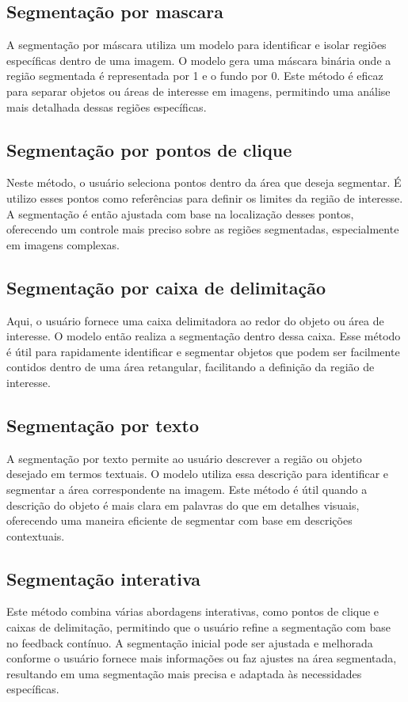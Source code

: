 \subsection{Segmentação por mascara}
A segmentação por máscara utiliza um modelo para identificar e isolar regiões específicas dentro de uma imagem. 
O modelo gera uma máscara binária onde a região segmentada é representada por 1 e o fundo por 0.
 Este método é eficaz para separar objetos ou áreas de interesse em imagens, permitindo uma análise mais detalhada dessas regiões específicas.

\subsection{Segmentação por pontos de clique}
Neste método, o usuário seleciona pontos dentro da área que deseja segmentar.
É utilizo esses pontos como referências para definir os limites da região de interesse.
 A segmentação é então ajustada com base na localização desses pontos, oferecendo um controle mais preciso sobre as regiões segmentadas, especialmente em imagens complexas.

\subsection{Segmentação por caixa de delimitação}
Aqui, o usuário fornece uma caixa delimitadora ao redor do objeto ou área de interesse. 
O modelo então realiza a segmentação dentro dessa caixa. 
Esse método é útil para rapidamente identificar e segmentar objetos que podem ser facilmente contidos dentro de uma área retangular, facilitando a definição da região de interesse.


\subsection{Segmentação por texto}
A segmentação por texto permite ao usuário descrever a região ou objeto desejado em termos textuais. 
O modelo utiliza essa descrição para identificar e segmentar a área correspondente na imagem. 
Este método é útil quando a descrição do objeto é mais clara em palavras do que em detalhes visuais, oferecendo uma maneira eficiente de segmentar com base em descrições contextuais.


\subsection{Segmentação interativa}
Este método combina várias abordagens interativas, como pontos de clique e caixas de delimitação, permitindo que o usuário refine a segmentação com base no feedback contínuo. 
A segmentação inicial pode ser ajustada e melhorada conforme o usuário fornece mais informações ou faz ajustes na área segmentada, resultando em uma segmentação mais precisa e adaptada às necessidades específicas.


